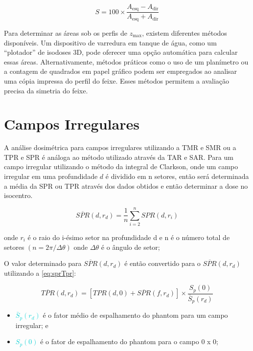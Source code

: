 \documentclass[11pt,a4paper]{article}
\newcounter{exemplo}
\begin{document}
    \begin{equation}
        S = 100 \times \frac{A_{\text{esq}} - A_{\text{dir}}}{A_{\text{esq}} + A_{\text{dir}}}
    \end{equation}

    Para determinar as áreas sob os perfis de $z_{\text{max}}$, existem diferentes métodos disponíveis. Um dispositivo de varredura em tanque de água, como um ``plotador'' de isodoses 3D, pode oferecer uma opção automática para calcular essas áreas. Alternativamente, métodos práticos como o uso de um planímetro ou a contagem de quadrados em papel gráfico podem ser empregados ao analisar uma cópia impressa do perfil do feixe. Esses métodos permitem a avaliação precisa da simetria do feixe.

\section{Campos Irregulares}

        A análise dosimétrica para campos irregulares utilizando a TMR e SMR ou a TPR e SPR é análoga ao método utilizado através da TAR e SAR.  Para um campo irregular utilizando o método da integral de Clarkson, onde um campo irregular em uma profundidade $d$ é dividido em n setores, então será determinada a média da SPR ou TPR através dos dados obtidos e então determinar a dose no isocentro.

        $$\overline{SPR}(d, r_d) = \frac{1}{n} \sum_{i = 2}^{n} SPR(d, r_i)$$


        onde $r_i$ é o raio do i-ésimo setor na profundidade d e n é o número total de setores $(n = 2\pi/\Delta \theta)$ onde $\Delta\theta$  é o ângulo de setor;

        O valor determinado para $\overline{SPR}(d, r_d)$ é então convertido para o $\overline{SPR}(d, r_d)$ utilizando a \ref{eq:sprTpr}:


        $$\overline{TPR}(d, r_d) = \left[TPR(d,0) +\overline{SPR}(f, r_d)\right]\times \frac{S_p(0)}{\bar{S}_p(r_d)}$$

        \begin{exemplo}[onde]
            \begin{itemize}
                \item \textcolor{DarkTurquoise}{$\bar{S}_p(r_d)$} é o fator médio de espalhamento do phantom para um campo irregular; e
                \item \textcolor{DarkTurquoise}{$S_p(0)$} é o fator de espalhamento do phantom para o campo 0 x 0;
            \end{itemize}
        \end{exemplo}
\end{document}
